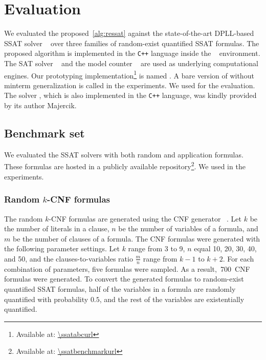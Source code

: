 \newcommand{\nrandom}{\num{700}}
\newcommand{\napplication}{\num{120}}
\newcommand{\nstrategic}{\num{60}}
\newcommand{\npec}{\num{60}}

\section{Evaluation}
\label{sect:ressat-evaluation}

We evaluated the proposed~\cref{alg:ressat} against
the state-of-the-art DPLL-based SSAT solver \dcssat~\cite{Majercik2005}
over three families of random-exist quantified SSAT formulas.
The proposed algorithm is implemented in the \texttt{C++} language inside the \abc~\cite{ABC} environment.
The SAT solver ~\cite{Een2003Solver}
and the model counter \cachet~\cite{Sang2004}
are used as underlying computational engines.
Our prototyping implementation\footnote{Available at: \url{\ssatabcurl}} is named \ressat.
A bare version of \ressat without minterm generalization is called \ressatb in the experiments.
We used \ssatABCRevision for the evaluation.
The solver \dcssat,
which is also implemented in the \texttt{C++} language,
was kindly provided by its author Majercik.

\subsection{Benchmark set}
We evaluated the SSAT solvers with both random and application formulas.
These formulas are hosted in a publicly available repository\footnote{Available at: \url{\ssatbenchmarkurl}}.
We used \ssatBenchRevision in the experiments.

\subsubsection{Random $k$-CNF formulas}
The random $k$-CNF formulas are generated using the CNF generator \cnfgen~\cite{Lauria2017CNFgen}.
Let $k$ be the number of literals in a clause,
$n$ be the number of variables of a formula,
and $m$ be the number of clauses of a formula.
The CNF formulas were generated with the following parameter settings.
Let $k$ range from 3 to 9,
$n$ equal 10, 20, 30, 40, and 50,
and the clauses-to-variables ratio $\frac{m}{n}$ range from $k-1$ to $k+2$.
For each combination of parameters,
five formulas were sampled.
As a result,~\nrandom~CNF formulas were generated.
To convert the generated formulas to random-exist quantified SSAT formulas,
half of the variables in a formula are randomly quantified with probability $0.5$,
and the rest of the variables are existentially quantified.


